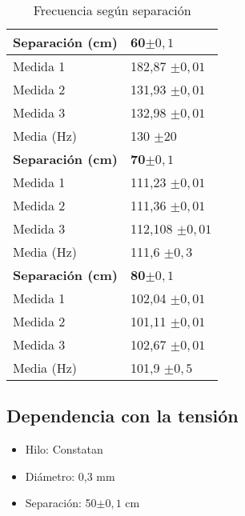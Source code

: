 \documentclass[a4paper,12pt,spanish]{article}
\begin{document}
\begin{table}[H]
\begin{minipage}[t]{.48\linewidth}
	\end{minipage}\hfill
	\mbox{}
	\begin{minipage}[t]{.48\linewidth}%
		\centering
		\begin{tabular}{|l|l|}
			\hline
			\textbf{Separación (cm)} & \textbf{60$\pm 0,1$} \\ \hline
			Medida 1             & 182,87 $\pm 0,01$    \\ \hline
			Medida 2            & 131,93  $\pm 0,01$   \\ \hline
			Medida 3             & 132,98  $\pm 0,01$   \\ \hline
			Media  (Hz)               & 130  $\pm 20$    \\ \hline\hline
			\textbf{Separación (cm)} & \textbf{70$\pm 0,1$} \\ \hline
			Medida 1            & 111,23  $\pm 0,01$   \\ \hline
			Medida 2            & 111,36  $\pm 0,01$   \\ \hline
			Medida 3            & 112,108 $\pm 0,01$   \\ \hline
			Media (Hz)                & 111,6 $\pm 0,3$    \\ \hline\hline
			\textbf{Separación (cm)} & \textbf{80$\pm 0,1$} \\ \hline
			Medida 1           & 102,04 $\pm 0,01$     \\ \hline
			Medida 2             & 101,11 $\pm 0,01$    \\ \hline
			Medida 3            & 102,67 $\pm 0,01$    \\ \hline
			Media (Hz)               & 101,9  $\pm 0,5$    \\ \hline
		\end{tabular}
		
	\end{minipage}\hfill
	\mbox{}
	\caption{Frecuencia según separación}
\end{table}





\subsection{Dependencia con la tensión}
\begin{itemize}
	\item{Hilo: Constatan}
	\item{Diámetro: 0,3 mm}
	\item{Separación: 50$\pm 0,1$ cm}
\end{itemize}
\end{document}
